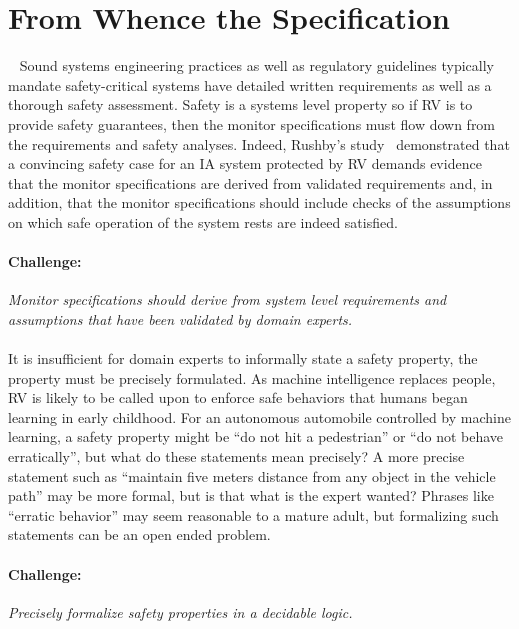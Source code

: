 \section{From Whence the Specification}~\label{sec:req} Sound systems
engineering practices as well as regulatory guidelines typically
mandate safety-critical systems have detailed written requirements as
well as a thorough safety assessment. Safety is a systems level
property so if RV is to provide safety guarantees, then the monitor
specifications must flow down from the requirements and safety
analyses.  Indeed, Rushby's study~\cite{rvRushby,RushbyAIAA09}
demonstrated that a convincing safety case
for an IA system protected by RV demands evidence that the monitor
specifications are derived from validated requirements and, in
addition, that the monitor specifications should include checks of the
assumptions on which safe operation of the system rests are indeed
satisfied.

\paragraph{Challenge:} \emph{ Monitor specifications should derive from
  system level requirements and assumptions that have been validated
  by domain experts.} 


\paragraph{}It is insufficient for domain experts to informally state
a safety property, the property must be precisely formulated.  As
machine intelligence replaces people, RV is likely to be called upon
to enforce safe behaviors that humans began learning in early
childhood.  For an autonomous automobile controlled by machine
learning, a safety property might be ``do not hit a pedestrian'' or
``do not behave erratically'', but what do these statements mean
precisely?  A more precise statement such as ``maintain five meters
distance from any object in the vehicle path'' may be more formal, but
is that what is the expert wanted?  Phrases like ``erratic behavior''
may seem reasonable to a mature adult, but formalizing such statements
can be an open ended problem.

\paragraph{Challenge:} \emph{Precisely formalize safety properties  in
  a decidable logic.}


